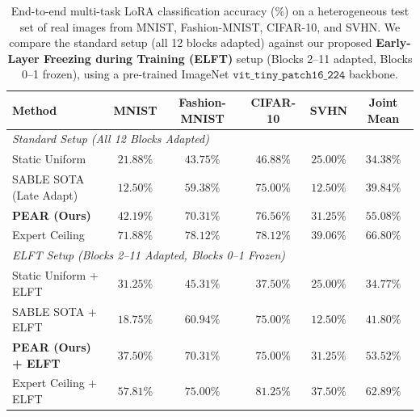 \begin{table}[t]
\caption{End-to-end multi-task LoRA classification accuracy (\%) on a heterogeneous test set of real images from MNIST, Fashion-MNIST, CIFAR-10, and SVHN. We compare the standard setup (all 12 blocks adapted) against our proposed \textbf{Early-Layer Freezing during Training (ELFT)} setup (Blocks 2--11 adapted, Blocks 0--1 frozen), using a pre-trained ImageNet $\mathtt{vit\_tiny\_patch16\_224}$ backbone.}
\label{tab:real_world_lora}
\vskip 0.15in
\begin{center}
\begin{small}
\begin{sc}
\begin{tabular}{lccccc}
\toprule
Method & MNIST & Fashion-MNIST & CIFAR-10 & SVHN & Joint Mean \\
\midrule
\multicolumn{6}{l}{\textit{Standard Setup (All 12 Blocks Adapted)}} \\
Static Uniform & $21.88\%$ & $43.75\%$ & $46.88\%$ & $25.00\%$ & $34.38\%$ \\
SABLE SOTA (Late Adapt) & $12.50\%$ & $59.38\%$ & $75.00\%$ & $12.50\%$ & $39.84\%$ \\
\textbf{PEAR (Ours)} & $42.19\%$ & $70.31\%$ & $76.56\%$ & $31.25\%$ & $\mathbf{55.08\%}$ \\
Expert Ceiling & $71.88\%$ & $78.12\%$ & $78.12\%$ & $39.06\%$ & $66.80\%$ \\
\midrule
\multicolumn{6}{l}{\textit{ELFT Setup (Blocks 2--11 Adapted, Blocks 0--1 Frozen)}} \\
Static Uniform + ELFT & $31.25\%$ & $45.31\%$ & $37.50\%$ & $25.00\%$ & $34.77\%$ \\
SABLE SOTA + ELFT & $18.75\%$ & $60.94\%$ & $75.00\%$ & $12.50\%$ & $41.80\%$ \\
\textbf{PEAR (Ours) + ELFT} & $37.50\%$ & $70.31\%$ & $75.00\%$ & $31.25\%$ & $\mathbf{53.52\%}$ \\
Expert Ceiling + ELFT & $57.81\%$ & $75.00\%$ & $81.25\%$ & $37.50\%$ & $62.89\%$ \\
\bottomrule
\end{tabular}
\end{sc}
\end{small}
\end{center}
\vskip -0.1in
\end{table}

